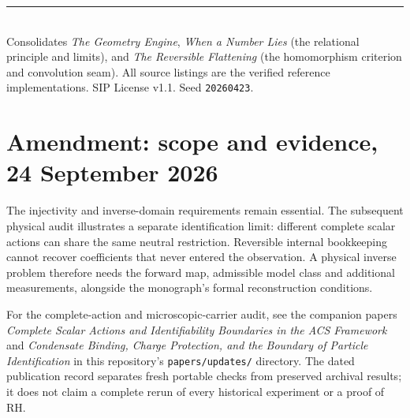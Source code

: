 \documentclass[11pt]{article}
\begin{document}
\vspace{1em}\noindent\rule{\linewidth}{0.4pt}\\
\small Consolidates \textit{The Geometry Engine}, \textit{When a Number Lies} (the relational principle and limits), and \textit{The Reversible Flattening} (the
homomorphism criterion and convolution seam). All source listings are the verified reference implementations.
SIP License v1.1. Seed \texttt{20260423}.

\section*{Amendment: scope and evidence, 24 September 2026}
The injectivity and inverse-domain requirements remain essential. The subsequent physical audit illustrates a separate identification limit: different complete scalar actions can share the same neutral restriction. Reversible internal bookkeeping cannot recover coefficients that never entered the observation. A physical inverse problem therefore needs the forward map, admissible model class and additional measurements, alongside the monograph's formal reconstruction conditions.

For the complete-action and microscopic-carrier audit, see the companion
papers \emph{Complete Scalar Actions and Identifiability Boundaries in the ACS
Framework} and \emph{Condensate Binding, Charge Protection, and the Boundary
of Particle Identification} in this repository's \texttt{papers/updates/}
directory. The dated publication record separates fresh portable checks
from preserved archival results; it does not claim a complete rerun of every
historical experiment or a proof of RH.
\end{document}

